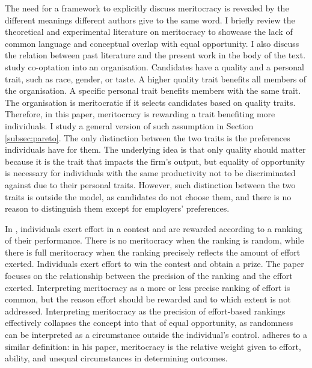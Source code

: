 The need for a framework to explicitly discuss meritocracy is revealed by the different meanings different authors give to the same word. I briefly review the theoretical and experimental literature on meritocracy to showcase the lack of common language and conceptual overlap with equal opportunity. I also discuss the relation between past literature and the present work in the body of the text. \cite{moissonCooptationMeritocracyVs2024} study co-optation into an organisation. Candidates have a quality and a personal trait, such as race, gender, or taste. A higher quality trait benefits all members of the organisation. A specific personal trait benefits members with the same trait. The organisation is meritocratic if it selects candidates based on quality traits. Therefore, in this paper, meritocracy is rewarding a trait benefiting more individuals. I study a general version of such assumption in Section \ref{subsec:pareto}. The only distinction between the two traits is the preferences individuals have for them. The underlying idea is that only quality should matter because it is the trait that impacts the firm's output, but equality of opportunity is necessary for individuals with the same productivity not to be discriminated against due to their personal traits. However, such distinction between the two traits is outside the model, as candidates do not choose them, and there is no reason to distinguish them except for employers' preferences.

In \cite{morganLimitsMeritocracy2022}, individuals exert effort in a contest and are rewarded according to a ranking of their performance. There is no meritocracy when the ranking is random, while there is full meritocracy when the ranking precisely reflects the amount of effort exerted. Individuals exert effort to win the contest and obtain a prize. The paper focuses on the relationship between the precision of the ranking and the effort exerted. Interpreting meritocracy as a more or less precise ranking of effort is common, but the reason effort should be rewarded and to which extent is not addressed. Interpreting meritocracy as the precision of effort-based rankings effectively collapses the concept into that of equal opportunity, as randomness can be interpreted as a circumstance outside the individual's control. \cite{moisson2024meritocracy} adheres to a similar definition: in his paper, meritocracy is the relative weight given to effort, ability, and unequal circumstances in determining outcomes.

